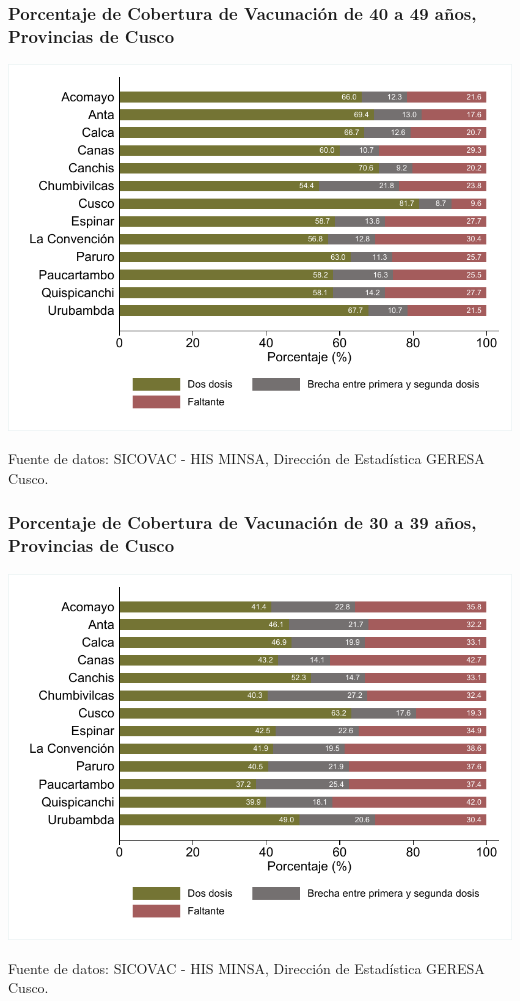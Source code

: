 \documentclass[xcolor=table]{beamer}
\begin{document}
\begin{frame}[label=vacunas_40]
	\frametitle{Porcentaje de Cobertura de Vacunación de 40 a 49 años, Provincias de Cusco}
	\vspace{-.5cm}
	\begin{center}
		\includegraphics[width=0.8\linewidth, trim={.2cm .5cm .2cm .2cm},clip]{../figuras/vacunacion_provincial_edad_4.pdf}
	\end{center}
	{\tiny Fuente de datos: SICOVAC - HIS MINSA, Dirección de Estadística GERESA Cusco. \\}
\hyperlink{cobertura_vacuna_provincias}{}
\end{frame}

\begin{frame}[label=vacunas_30]
	\frametitle{Porcentaje de Cobertura de Vacunación de 30 a 39 años, Provincias de Cusco}
	\vspace{-.5cm}
	\begin{center}
		\includegraphics[width=0.8\linewidth, trim={.2cm .5cm .2cm .2cm},clip]{../figuras/vacunacion_provincial_edad_3.pdf}
	\end{center}
	{\tiny Fuente de datos: SICOVAC - HIS MINSA, Dirección de Estadística GERESA Cusco. \\}
\hyperlink{cobertura_vacuna_provincias}{}
\end{frame}
\end{document}
